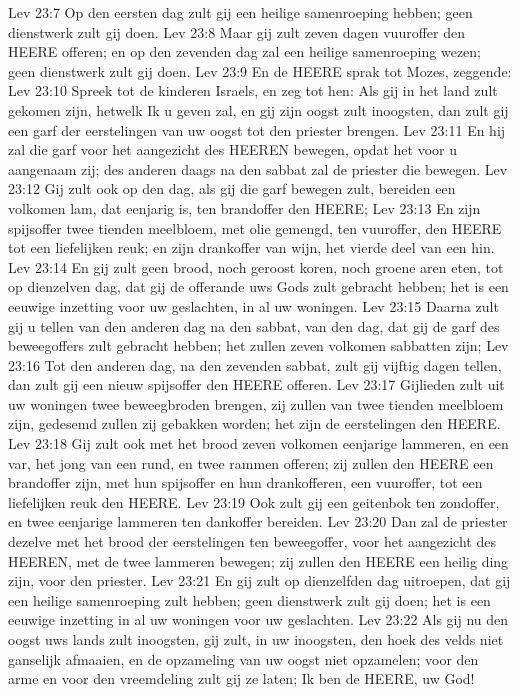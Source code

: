 Lev 23:7  Op den eersten dag zult gij een heilige samenroeping hebben; geen dienstwerk zult gij doen.
Lev 23:8  Maar gij zult zeven dagen vuuroffer den HEERE offeren; en op den zevenden dag zal een heilige samenroeping wezen; geen dienstwerk zult gij doen.
Lev 23:9  En de HEERE sprak tot Mozes, zeggende:
Lev 23:10  Spreek tot de kinderen Israels, en zeg tot hen: Als gij in het land zult gekomen zijn, hetwelk Ik u geven zal, en gij zijn oogst zult inoogsten, dan zult gij een garf der eerstelingen van uw oogst tot den priester brengen.
Lev 23:11  En hij zal die garf voor het aangezicht des HEEREN bewegen, opdat het voor u aangenaam zij; des anderen daags na den sabbat zal de priester die bewegen.
Lev 23:12  Gij zult ook op den dag, als gij die garf bewegen zult, bereiden een volkomen lam, dat eenjarig is, ten brandoffer den HEERE;
Lev 23:13  En zijn spijsoffer twee tienden meelbloem, met olie gemengd, ten vuuroffer, den HEERE tot een liefelijken reuk; en zijn drankoffer van wijn, het vierde deel van een hin.
Lev 23:14  En gij zult geen brood, noch geroost koren, noch groene aren eten, tot op dienzelven dag, dat gij de offerande uws Gods zult gebracht hebben; het is een eeuwige inzetting voor uw geslachten, in al uw woningen.
Lev 23:15  Daarna zult gij u tellen van den anderen dag na den sabbat, van den dag, dat gij de garf des beweegoffers zult gebracht hebben; het zullen zeven volkomen sabbatten zijn;
Lev 23:16  Tot den anderen dag, na den zevenden sabbat, zult gij vijftig dagen tellen, dan zult gij een nieuw spijsoffer den HEERE offeren.
Lev 23:17  Gijlieden zult uit uw woningen twee beweegbroden brengen, zij zullen van twee tienden meelbloem zijn, gedesemd zullen zij gebakken worden; het zijn de eerstelingen den HEERE.
Lev 23:18  Gij zult ook met het brood zeven volkomen eenjarige lammeren, en een var, het jong van een rund, en twee rammen offeren; zij zullen den HEERE een brandoffer zijn, met hun spijsoffer en hun drankofferen, een vuuroffer, tot een liefelijken reuk den HEERE.
Lev 23:19  Ook zult gij een geitenbok ten zondoffer, en twee eenjarige lammeren ten dankoffer bereiden.
Lev 23:20  Dan zal de priester dezelve met het brood der eerstelingen ten beweegoffer, voor het aangezicht des HEEREN, met de twee lammeren bewegen; zij zullen den HEERE een heilig ding zijn, voor den priester.
Lev 23:21  En gij zult op dienzelfden dag uitroepen, dat gij een heilige samenroeping zult hebben; geen dienstwerk zult gij doen; het is een eeuwige inzetting in al uw woningen voor uw geslachten.
Lev 23:22  Als gij nu den oogst uws lands zult inoogsten, gij zult, in uw inoogsten, den hoek des velds niet ganselijk afmaaien, en de opzameling van uw oogst niet opzamelen; voor den arme en voor den vreemdeling zult gij ze laten; Ik ben de HEERE, uw God!
